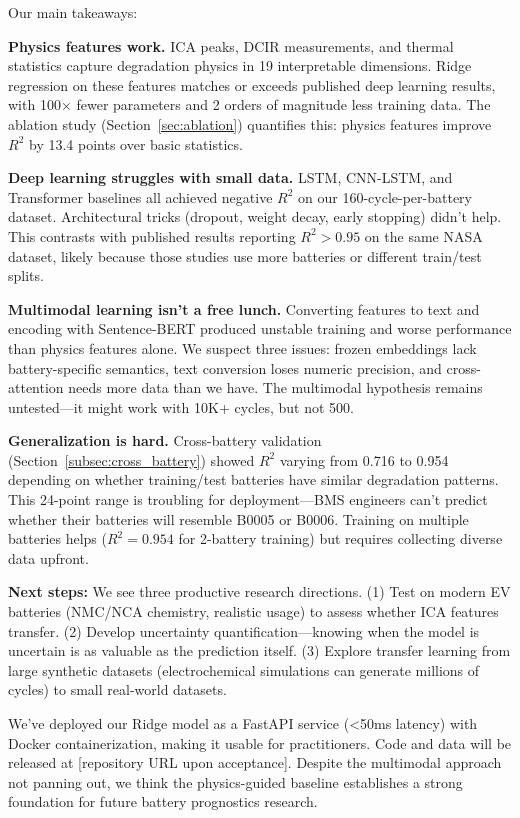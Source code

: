 \documentclass{sn-jnl}
\begin{document}
Our main takeaways:

\textbf{Physics features work.} ICA peaks, DCIR measurements, and thermal statistics capture degradation physics in 19 interpretable dimensions. Ridge regression on these features matches or exceeds published deep learning results, with 100× fewer parameters and 2 orders of magnitude less training data. The ablation study (Section~\ref{sec:ablation}) quantifies this: physics features improve $R^2$ by 13.4 points over basic statistics.

\textbf{Deep learning struggles with small data.} LSTM, CNN-LSTM, and Transformer baselines all achieved negative $R^2$ on our 160-cycle-per-battery dataset. Architectural tricks (dropout, weight decay, early stopping) didn't help. This contrasts with published results reporting $R^2 > 0.95$ on the same NASA dataset, likely because those studies use more batteries or different train/test splits.

\textbf{Multimodal learning isn't a free lunch.} Converting features to text and encoding with Sentence-BERT produced unstable training and worse performance than physics features alone. We suspect three issues: frozen embeddings lack battery-specific semantics, text conversion loses numeric precision, and cross-attention needs more data than we have. The multimodal hypothesis remains untested—it might work with 10K+ cycles, but not 500.

\textbf{Generalization is hard.} Cross-battery validation (Section~\ref{subsec:cross_battery}) showed $R^2$ varying from 0.716 to 0.954 depending on whether training/test batteries have similar degradation patterns. This 24-point range is troubling for deployment—BMS engineers can't predict whether their batteries will resemble B0005 or B0006. Training on multiple batteries helps ($R^2 = 0.954$ for 2-battery training) but requires collecting diverse data upfront.

\textbf{Next steps:} We see three productive research directions. (1) Test on modern EV batteries (NMC/NCA chemistry, realistic usage) to assess whether ICA features transfer. (2) Develop uncertainty quantification—knowing when the model is uncertain is as valuable as the prediction itself. (3) Explore transfer learning from large synthetic datasets (electrochemical simulations can generate millions of cycles) to small real-world datasets.

We've deployed our Ridge model as a FastAPI service (<50ms latency) with Docker containerization, making it usable for practitioners. Code and data will be released at [repository URL upon acceptance]. Despite the multimodal approach not panning out, we think the physics-guided baseline establishes a strong foundation for future battery prognostics research.
\end{document}
